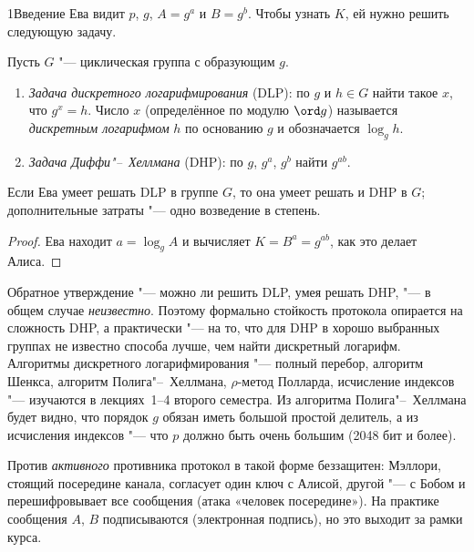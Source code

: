 \begin{lecture}{1}{Введение}
Ева видит $p$, $g$, $A = g^a$ и $B = g^b$. Чтобы узнать $K$, ей нужно решить следующую задачу.

\begin{definition}\label{l1:dhp}
Пусть $G$ "--- циклическая группа с образующим $g$.
\begin{enumerate}
  \item \emph{Задача дискретного логарифмирования} (DLP): по $g$ и $h \in G$ найти такое
    $x$, что $g^x = h$. Число $x$ (определённое по модулю $\ord g$) называется
    \emph{дискретным логарифмом} $h$ по основанию $g$ и обозначается $\log_g h$.
  \item \emph{Задача Диффи"--~Хеллмана} (DHP): по $g$, $g^a$, $g^b$ найти $g^{ab}$.
\end{enumerate}
\end{definition}

\begin{proposition}\label{l1:dhp-dlp}
Если Ева умеет решать DLP в группе $G$, то она умеет решать и DHP в $G$; дополнительные
затраты "--- одно возведение в степень.
\end{proposition}

\begin{proof}
Ева находит $a = \log_g A$ и вычисляет $K = B^a = g^{ab}$, как это делает Алиса.
\end{proof}

Обратное утверждение "--- можно ли решить DLP, умея решать DHP, "--- в общем случае
\emph{неизвестно}. Поэтому формально стойкость протокола опирается на сложность DHP, а
практически "--- на то, что для DHP в хорошо выбранных группах не известно способа лучше, чем
найти дискретный логарифм. Алгоритмы дискретного логарифмирования "--- полный перебор, алгоритм
Шенкса, алгоритм Полига"--~Хеллмана, $\rho$-метод Полларда, исчисление индексов "--- изучаются
в лекциях~1--4 второго семестра. Из алгоритма Полига"--~Хеллмана будет видно, что порядок $g$
обязан иметь большой простой делитель, а из исчисления индексов "--- что $p$ должно быть очень
большим (2048 бит и более).

\begin{remark}
Против \emph{активного} противника протокол в такой форме беззащитен: Мэллори, стоящий
посередине канала, согласует один ключ с Алисой, другой "--- с Бобом и перешифровывает все
сообщения (атака «человек посередине»). На практике сообщения $A$, $B$ подписываются
(электронная подпись), но это выходит за рамки курса.
\end{remark}



\end{lecture}
